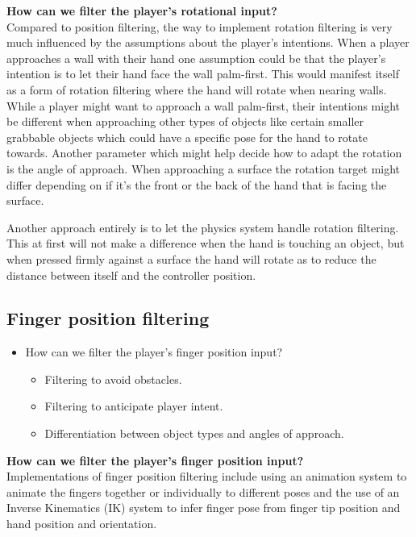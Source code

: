 \textbf{How can we filter the player's rotational input?}\\
Compared to position filtering, the way to implement rotation filtering is very much influenced by the assumptions about the player's intentions. When a player approaches a wall with their hand one assumption could be that the player's intention is to let their hand face the wall palm-first. This would manifest itself as a form of rotation filtering where the hand will rotate when nearing walls. While a player might want to approach a wall palm-first, their intentions might be different when approaching other types of objects like certain smaller grabbable objects which could have a specific pose for the hand to rotate towards. Another parameter which might help decide how to adapt the rotation is the angle of approach. When approaching a surface the rotation target might differ depending on if it's the front or the back of the hand that is facing the surface.

Another approach entirely is to let the physics system handle rotation filtering. This at first will not make a difference when the hand is touching an object, but when pressed firmly against a surface the hand will rotate as to reduce the distance between itself and the controller position.

\subsection{Finger position filtering}
\label{subsec:implementationFingerFiltering}
\begin{itemize}
\item How can we filter the player's finger position input?
\begin{itemize}
\item Filtering to avoid obstacles.
\item Filtering to anticipate player intent.
\item Differentiation between object types and angles of approach.
\end{itemize}
\end{itemize}

\textbf{How can we filter the player's finger position input?}\\
Implementations of finger position filtering include using an animation system to animate the fingers together or individually to different poses and the use of an Inverse Kinematics (IK) system to infer finger pose from finger tip position and hand position and orientation.

